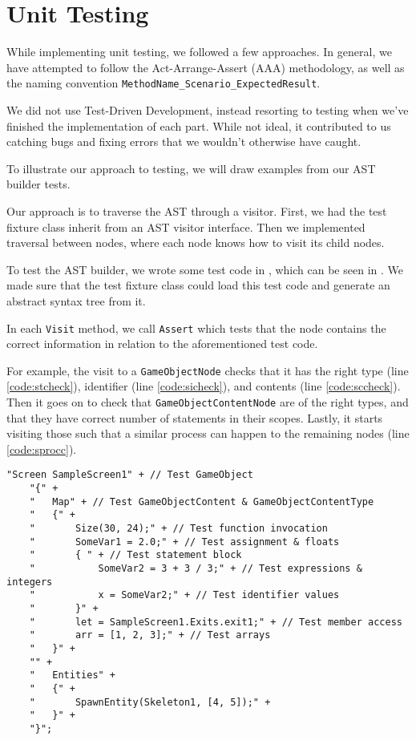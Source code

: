 \section{Unit Testing}
While implementing unit testing, we followed a few approaches.
In general, we have attempted to follow the Act-Arrange-Assert (AAA)
methodology, as well as the naming convention 
\texttt{MethodName\_Scenario\_ExpectedResult}.

We did not use Test-Driven Development, instead resorting to testing
when we've finished the implementation of each part. While not ideal, it
contributed to us catching bugs and fixing errors that we wouldn't
otherwise have caught.

To illustrate our approach to testing, we will draw examples from our
AST builder tests.

Our approach is to traverse the AST through a visitor. First,
we had the test fixture class inherit from an AST visitor interface.
Then we implemented traversal between nodes, where each node knows how
to visit its child nodes.

To test the AST builder, we wrote some test code in \dazel{}, which can be seen in . We made sure that
the test fixture class could load this test code and generate an abstract syntax tree from it.

In each \texttt{Visit} method, we call \texttt{Assert} which tests
that the node contains the correct information in relation to the
aforementioned \dazel{} test code.

For example, the visit to a \texttt{GameObjectNode} checks that it has the
right type (line \ref{code:stcheck}), identifier (line \ref{code:sicheck}), and contents (line \ref{code:sccheck}). Then it goes on to check that
\texttt{GameObjectContentNode} are of the right types, and that they have
correct number of statements in their scopes. Lastly, it starts visiting
those such that a similar process can happen to the remaining nodes (line \ref{code:sprocc}).

\begin{lstlisting}[caption={AST Builder \dazel{} test code}, label={lst:asttestcode}]
    "Screen SampleScreen1" + // Test GameObject
    "{" +
    "   Map" + // Test GameObjectContent & GameObjectContentType
    "   {" +
    "       Size(30, 24);" + // Test function invocation
    "       SomeVar1 = 2.0;" + // Test assignment & floats
    "       { " + // Test statement block
    "           SomeVar2 = 3 + 3 / 3;" + // Test expressions & integers
    "           x = SomeVar2;" + // Test identifier values
    "       }" +
    "       let = SampleScreen1.Exits.exit1;" + // Test member access 
    "       arr = [1, 2, 3];" + // Test arrays
    "   }" +
    "" +
    "   Entities" +
    "   {" +
    "       SpawnEntity(Skeleton1, [4, 5]);" +
    "   }" +
    "}";
    \end{lstlisting}


